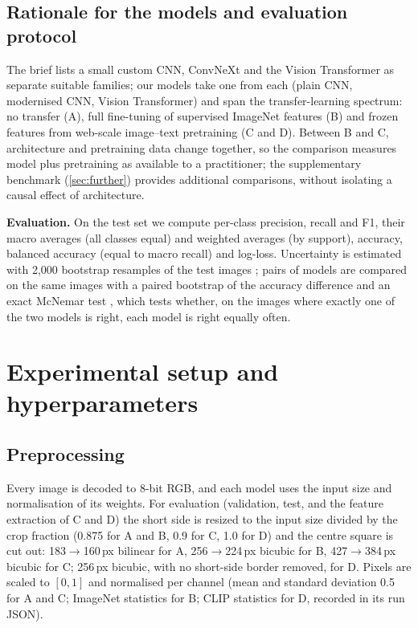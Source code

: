\documentclass[11pt,a4paper]{article}
\begin{document}
\subsection{Rationale for the models and evaluation protocol}
The brief lists a small custom CNN, ConvNeXt and the Vision Transformer as separate suitable families; our models
take one from each (plain CNN, modernised CNN, Vision Transformer) and span the transfer-learning
spectrum: no transfer (A), full fine-tuning of supervised ImageNet features (B) and frozen features from web-scale
image--text pretraining (C and D). Between B and C, architecture and pretraining data change together, so the comparison
measures model plus pretraining as available to a practitioner; the supplementary benchmark
(\cref{sec:further}) provides additional comparisons, without isolating a causal effect of architecture.

\textbf{Evaluation.} On the test set we compute per-class precision, recall and F1, their macro averages (all classes equal) and weighted
averages (by support), accuracy, balanced accuracy (equal to macro recall) and log-loss. Uncertainty is estimated with
2,000 bootstrap resamples of the test images \citep{efron1979bootstrap}; pairs of models are compared on the same
images with a paired bootstrap of the accuracy difference and an exact McNemar test \citep{mcnemar1947}, which
tests whether, on the images where exactly one of the two models is right, each model is right equally often.

\section{Experimental setup and hyperparameters}\label{sec:setup}

\subsection{Preprocessing}
Every image is decoded to 8-bit RGB, and each model uses the input size and normalisation of its weights. For evaluation (validation, test, and the
feature extraction of C and D) the short side is resized to the input size divided by the crop fraction (0.875 for A
and B, 0.9 for C, 1.0 for D) and the centre square is cut out:
183$\to$160\,px bilinear for A, 256$\to$224\,px bicubic for B, 427$\to$384\,px bicubic for C; 256\,px bicubic, with no short-side border removed, for D. Pixels are scaled to
$[0,1]$ and normalised per channel (mean and standard deviation 0.5 for A and C; ImageNet statistics for B; CLIP statistics for D, recorded in its run JSON).
\end{document}
